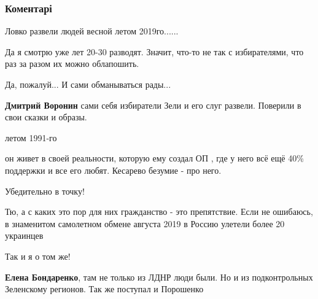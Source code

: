  
 
 
 
 
\subsubsection{Коментарі}
\label{sec:17_10_2021.fb.bondarenko_elena.1.karabas_barabas_zelja_medvedchuk.cmt}

\begin{itemize} %
Ловко развели людей весной летом 2019го......

\begin{itemize} %
Да я смотрю уже лет 20-30 разводят. Значит, что-то не так с избирателями, что раз за разом их можно облапошить.

Да, пожалуй...
И сами обманываться рады...

\textbf{Дмитрий Воронин} сами себя избиратели Зели и его слуг развели. Поверили в свои сказки и образы.

летом 1991-го
\end{itemize} %


он живет в своей реальности, которую ему создал ОП , где у него всё ещё 40\% поддержки и все его любят.
Кесарево безумие - про него.


Убедительно в точку!


Тю, а с каких это пор для них гражданство - это препятствие. Если не ошибаюсь,
в знаменитом самолетном обмене августа 2019 в Россию улетели более 20 украинцев

\begin{itemize} %
Так и я о том же!


\textbf{Елена Бондаренко}, там не только из ЛДНР люди были. Но и из подконтрольных Зеленскому регионов. Так же поступал и Порошенко
\end{itemize} %


\end{itemize}
